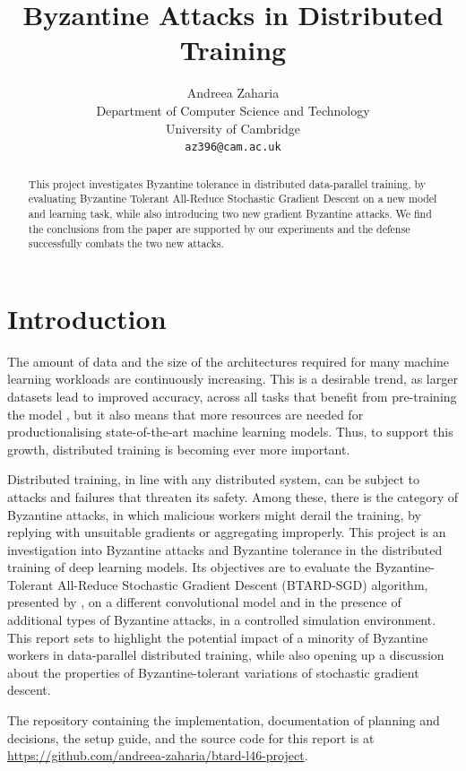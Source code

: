 \documentclass{article}
\title{Byzantine Attacks in Distributed Training}
\author{%
  Andreea Zaharia \\
  Department of Computer Science and Technology\\
  University of Cambridge\\
  \texttt{az396@cam.ac.uk} \\
}
\begin{document}
\maketitle

\begin{abstract}
This project investigates Byzantine tolerance in distributed data-parallel training, by evaluating Byzantine Tolerant All-Reduce Stochastic Gradient Descent \citep{gorbunov2021secure} on a new model and learning task, while also introducing two new gradient Byzantine attacks. We find the conclusions from the paper are supported by our experiments and the defense successfully combats the two new attacks.
\end{abstract}
\section{Introduction}
The amount of data and the size of the architectures required for many machine learning workloads are continuously increasing. This is a desirable trend, as larger datasets lead to improved accuracy, across all tasks that benefit from pre-training the model \citep{goyal2017accurate}, but it also means that more resources are needed for productionalising state-of-the-art machine learning models. Thus, to support this growth, distributed training is becoming ever more important.

Distributed training, in line with any distributed system, can be subject to attacks and failures that threaten its safety. Among these, there is the category of Byzantine attacks, in which malicious workers might derail the training, by replying with unsuitable gradients or aggregating improperly. This project is an investigation into Byzantine attacks and Byzantine tolerance in the distributed training of deep learning models. Its objectives are to evaluate the Byzantine-Tolerant All-Reduce Stochastic Gradient Descent (BTARD-SGD) algorithm, presented by \cite{gorbunov2021secure}, on a different convolutional model and in the presence of additional types of Byzantine attacks, in a controlled simulation environment. This report sets to highlight the potential impact of a minority of Byzantine workers in data-parallel distributed training, while also opening up a discussion about the properties of Byzantine-tolerant variations of stochastic gradient descent.

The repository containing the implementation, documentation of planning and decisions, the setup guide, and the source code for this report is at \url{https://github.com/andreea-zaharia/btard-l46-project}.
\end{document}

